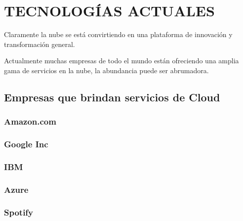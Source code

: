 \documentclass[a4paper, 12pt]{report}
\begin{document}
\chapter{TECNOLOG\'IAS ACTUALES}
\vspace*{-2em}
\begin{justify}
\par Claramente la nube se est\'a convirtiendo en una plataforma de innovaci\'on y transformaci\'on general.
\par Actualmente muchas empresas de todo el mundo est\'an ofreciendo una amplia gama de servicios en la nube, la abundancia puede ser abrumadora.
 
\section{Empresas que brindan servicios de Cloud}
\subsection{Amazon.com}
\subsection{Google Inc}
\subsection{IBM}
\subsection{Azure}
\subsection{Spotify}


\end{justify}
\end{document}
